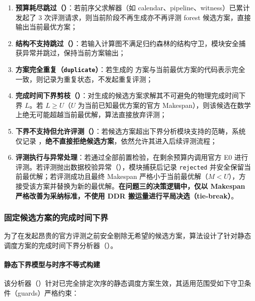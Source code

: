 \documentclass[anonymous,withtoc]{gmcm2026}
\providecommand{\tightlist}{\setlength{\itemsep}{0pt}\setlength{\parskip}{0pt}}
\begin{document}
\begin{enumerate}
\def\labelenumi{\arabic{enumi}.}
\tightlist
\item
  \textbf{预算耗尽跳过（\texttt{}）}：若前序父求解器（如 calendar、pipeline、witness）已累计发起了 3 次评测请求，则当前阶段不再生成亦不再评测 forest 候选方案，直接输出当前最优方案；
\item
  \textbf{结构不支持跳过（\texttt{}）}：若输入计算图不满足归约森林的结构守卫，模块安全捕获异常并跳过，保持当前方案输出；
\item
  \textbf{方案完全重复（\texttt{duplicate}）}：若生成的 \texttt{} 方案与当前最优方案的代码表示完全一致，则记录为重复状态，不发起重复评测；
\item
  \textbf{完成时间下界剪枝（\texttt{}）}：对生成的候选方案求解其不可避免的物理完成时间下界 \(L\)。若 \(L \ge U\)（\(U\) 为当前已知最优方案的官方 Makespan），则该候选在数学上绝无可能超越当前最优解，算法直接放弃评测；
\item
  \textbf{下界不支持但允许评测（\texttt{}）}：若候选方案超出下界分析模块支持的范畴，系统仅记录 \texttt{}，\textbf{绝不直接拒绝候选方案}，依然允许其进入后续评测流程；
\item
  \textbf{评测执行与异常处理}：若通过全部前置检验，在剩余预算内调用官方 E0 进行评测。若评测抛出数据校验异常（\texttt{}），模块捕获后记录 \texttt{rejected} 并安全保留当前最优解；若评测成功且最终 Makespan 严格小于当前最优解（\(M < U\)），方接受该方案并替换为新的最优解。\textbf{在问题三的决策逻辑中，仅以 Makespan 严格改善为采纳标准，不使用 DDR 搬运量进行平局决选（tie-break）}。
\end{enumerate}

\subsubsection{固定候选方案的完成时间下界}

为了在发起昂贵的官方评测之前安全剔除无希望的候选方案，算法设计了针对静态调度方案的完成时间下界分析器（\texttt{}）。

\paragraph{静态下界模型与时序不等式构建}

该分析器（\texttt{}）针对已完全排定次序的静态调度方案生效，其适用范围受如下守卫条件（guards）严格约束：
\end{document}

